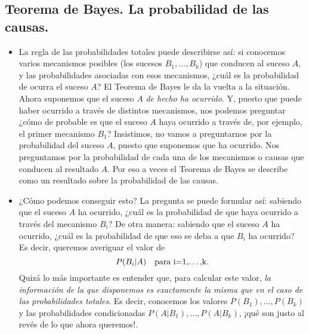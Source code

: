 \subsection{Teorema de Bayes. La probabilidad de las causas.}

\begin{itemize}

    \item La regla de las probabilidades totales puede describirse así: si conocemos varios mecanismos posibles (los sucesos $B_1,\ldots,B_k$) que conducen al suceso $A$, y las probabilidades asociadas con esos mecanismos, ¿cuál es la probabilidad de ocurra el suceso $A$? El Teorema de Bayes le da la vuelta a la situación. Ahora suponemos que el suceso $A$ {\em de hecho ha ocurrido}.  Y, puesto que puede haber ocurrido a través de distintos mecanismos, nos podemos preguntar ¿cómo de probable es que el suceso $A$ haya ocurrido a través de, por ejemplo, el primer mecanismo $B_1$? Insistimos, no vamos a preguntarnos por la probabilidad del suceso $A$, puesto que suponemos que ha ocurrido. Nos preguntamos por la probabilidad de cada una de los mecanismos o causas que conducen al resultado $A$. Por eso a veces el Teorema de Bayes se describe como un resultado sobre la probabilidad de las causas.

    \item ¿Cómo podemos conseguir esto? La pregunta se puede formular así: sabiendo que el suceso $A$ ha ocurrido, ¿cuál es la probabilidad de que haya ocurrido a través del mecanismo $B_i$? De otra manera: sabiendo que el suceso $A$ ha ocurrido, ¿cuál es la probabilidad de que eso se deba a que $B_i$ ha ocurrido? Es decir, queremos averiguar el valor de
        \[P(B_i|A)\mbox{\quad para i=1,\ldots,k}.\]
        Quizá lo más importante es entender que, para calcular este valor, {\em la información de la que disponemos es exactamente la misma que en el caso de las probabilidades totales}. Es decir, conocemos los valores $P(B_1),\ldots,P(B_k)$ y las probabilidades condicionadas $P(A|B_1),\ldots,P(A|B_k)$, ¡qué son justo al revés de lo que ahora queremos!.


\end{itemize}
